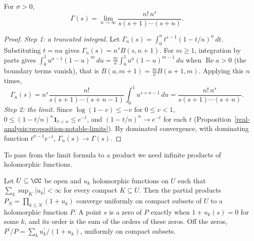 \begin{theorem}\label{special-functions:theorem-euler-limit}
For $\sigma > 0$,
\[
\Gamma(s) = \lim_{n \to \infty}\frac{n!\,n^s}{s(s + 1)\cdots(s + n)}.
\]
\end{theorem}

\begin{proof}
\emph{Step 1: a truncated integral.} Let $\Gamma_n(s) = \int_0^nt^{s-1}(1 - t/n)^n\,dt$. Substituting $t = nu$ gives $\Gamma_n(s) = n^sB(s, n + 1)$. For $m \geq 1$, integration by parts gives
$\int_0^1u^{a-1}(1 - u)^m\,du = \frac ma\int_0^1u^a(1 - u)^{m-1}\,du$ when $\operatorname{Re}a > 0$ (the boundary terms vanish), that is $B(a, m + 1) = \frac maB(a + 1, m)$. Applying this $n$ times,
\[
\Gamma_n(s) = n^s\frac{n!}{s(s + 1)\cdots(s + n - 1)}\int_0^1u^{s+n-1}\,du = \frac{n!\,n^s}{s(s + 1)\cdots(s + n)}.
\]
\emph{Step 2: the limit.} Since $\log(1 - v) \leq -v$ for $0 \leq v < 1$, $0 \leq (1 - t/n)^n\mathbf{1}_{t < n} \leq e^{-t}$, and $(1 - t/n)^n \to e^{-t}$ for each $t$
(Proposition~\ref{real-analysis:proposition-notable-limits}). By dominated convergence, with dominating function $t^{\sigma - 1}e^{-t}$, $\Gamma_n(s) \to \Gamma(s)$.
\end{proof}

To pass from the limit formula to a product we need infinite products of holomorphic functions.

\begin{lemma}\label{special-functions:lemma-infinite-products}
Let $U \subseteq \CC$ be open and $u_k$ holomorphic functions on $U$ such that $\sum_k\sup_K|u_k| < \infty$ for every compact $K \subseteq U$. Then the partial products $P_N = \prod_{k \leq N}(1 + u_k)$
converge uniformly on compact subsets of $U$ to a holomorphic function $P$. A point $s$ is a zero of $P$ exactly when $1 + u_k(s) = 0$ for some $k$, and its order is the sum of the orders of these
zeros. Off the zeros, $P^{\prime}/P = \sum_ku_k^{\prime}/(1 + u_k)$, uniformly on compact subsets.
\end{lemma}

